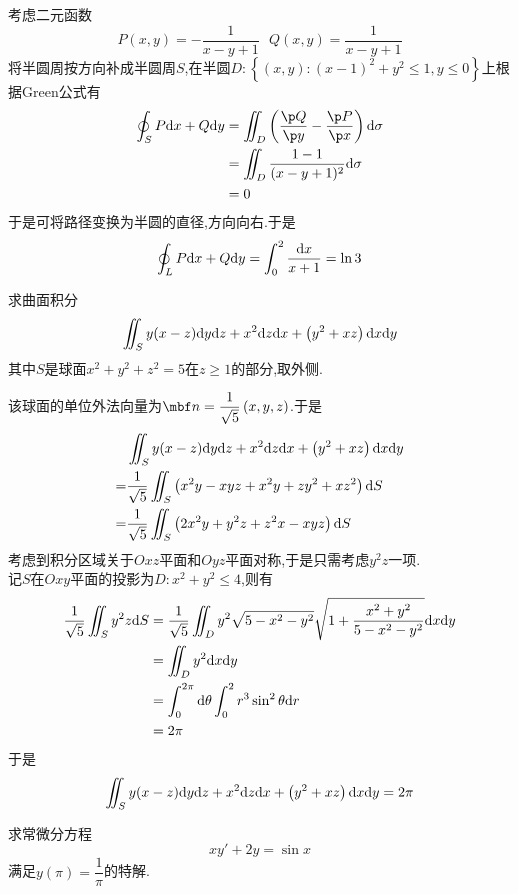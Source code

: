 \documentclass{ctexart}
\begin{document}
\begin{solution}
    考虑二元函数
    \[P(x,y)=-\dfrac{1}{x-y+1}\ \ \ Q(x,y)=\dfrac{1}{x-y+1}\]
    将半圆周按方向补成半圆周$S$,在半圆$D:\left\{(x,y):(x-1)^2+y^2\leqslant1,y\leqslant0\right\}$上根据Green公式有
    \[\begin{aligned}
        \oint_SP\dx+Q\di y
        &= \iint_{D}\left(\dfrac{\p Q}{\p y}-\dfrac{\p P}{\p x}\right)\di\sigma \\
        &= \iint_{D}\dfrac{1-1}{(x-y+1)^2}\di\sigma \\
        &= 0
    \end{aligned}\]
    于是可将路径变换为半圆的直径,方向向右.于是
    \[\oint_{L}P\mathrm{d} x+Q\mathrm{d} y=\int_0^2\dfrac{\mathrm{d} x}{x+1}=\ln3\]
\end{solution}
\begin{problem}[4.(15\songti{分})]
    求曲面积分
    \[\iint_Sy(x-z)\mathrm{d} y\mathrm{d} z+x^2\mathrm{d} z\mathrm{d} x+\left(y^2+xz\right)\mathrm{d} x\mathrm{d} y\]
    其中$S$是球面$x^2+y^2+z^2=5$在$z\geqslant 1$的部分,取外侧.
\end{problem}
\begin{solution}
    该球面的单位外法向量为$\mbf n=\dfrac{1}{\sqrt5}\left(x,y,z\right)$.于是
    \[\begin{aligned}
        &\iint_Sy(x-z)\mathrm{d} y\mathrm{d} z+x^2\mathrm{d} z\mathrm{d} x+\left(y^2+xz\right)\mathrm{d} x\mathrm{d} y \\
        =&\dfrac{1}{\sqrt5}\iint_S\left(x^2y-xyz+x^2y+zy^2+xz^2\right)\mathrm{d} S \\
        =&\dfrac{1}{\sqrt5}\iint_S\left(2x^2y+y^2z+z^2x-xyz\right)\mathrm{d} S
    \end{aligned}\]
    考虑到积分区域关于$Oxz$平面和$Oyz$平面对称,于是只需考虑$y^2z$一项.\\
    记$S$在$Oxy$平面的投影为$D:x^2+y^2\leqslant4$,则有
    \[\begin{aligned}
        \dfrac{1}{\sqrt5}\iint_{S}y^2z\mathrm{d} S
        &= \dfrac{1}{\sqrt5}\iint_{D}y^2\sqrt{5-x^2-y^2}\sqrt{1+\dfrac{x^2+y^2}{5-x^2-y^2}}\mathrm{d} x\mathrm{d} y \\
        &= \iint_{D}y^2\mathrm{d} x\mathrm{d} y \\
        &= \int_0^{2\pi}\mathrm{d}\theta\int_0^2 r^3\sin^2\theta\mathrm{d} r \\
        &= 2\pi
    \end{aligned}\]
    于是
    \[\iint_Sy(x-z)\mathrm{d} y\mathrm{d} z+x^2\mathrm{d} z\mathrm{d} x+\left(y^2+xz\right)\mathrm{d} x\mathrm{d} y=2\pi\]

\end{solution}
\begin{problem}[5.(10\songti{分})]
    求常微分方程
    \[xy'+2y=\sin x\]
    满足$y(\pi)=\dfrac1\pi$的特解.
\end{problem}
\end{document}
